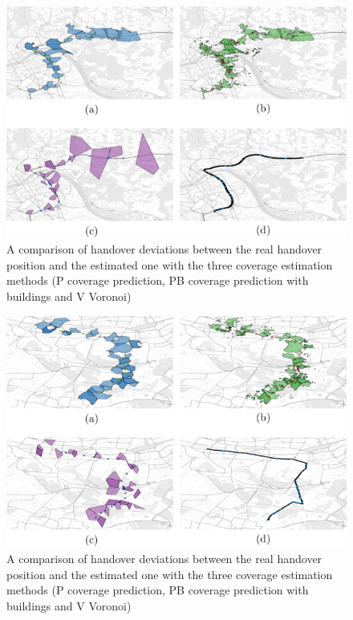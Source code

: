 	\begin{figure}[h!]
		\label{fig:563}
		\caption{ A comparison of handover deviations between the real handover position and the estimated one with the three coverage estimation methods (P coverage prediction, PB coverage prediction with buildings and V Voronoi)
		}
		\includegraphics[height=0.40\textheight]{images/563standalone.png}
	\end{figure}
	
	
	
	\begin{figure}[h!]
		\label{fig:144}
		\caption{ A comparison of handover deviations between the real handover position and the estimated one with the three coverage estimation methods (P coverage prediction, PB coverage prediction with buildings and V Voronoi)
		}
		\includegraphics[height=0.40\textheight]{images/144standalone.png}
	\end{figure}

